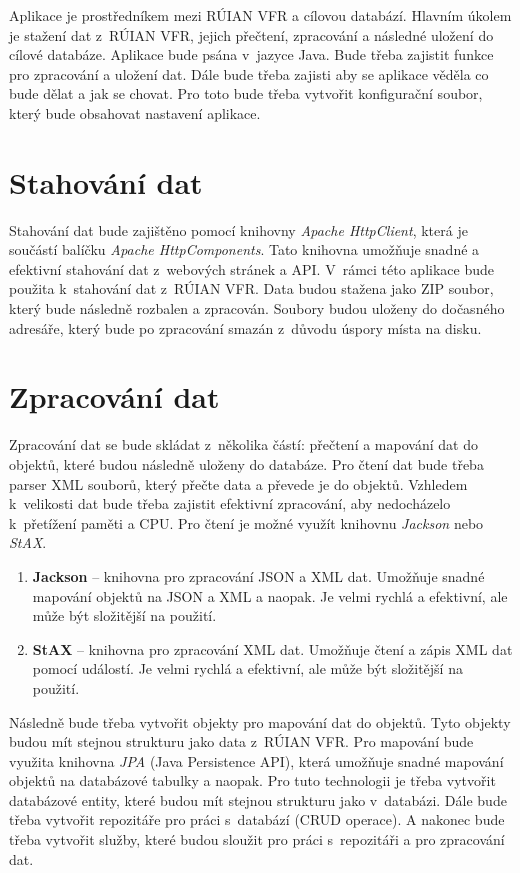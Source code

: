 Aplikace je prostředníkem mezi RÚIAN VFR a cílovou databází.
Hlavním úkolem je stažení dat z~RÚIAN VFR, jejich přečtení, zpracování a následné uložení do cílové databáze.
Aplikace bude psána v~jazyce Java. Bude třeba zajistit funkce pro zpracování a uložení dat.
Dále bude třeba zajisti aby se aplikace věděla co bude dělat a jak se chovat.
Pro toto bude třeba vytvořit konfigurační soubor, který bude obsahovat nastavení aplikace.

\section{Stahování dat}
Stahování dat bude zajištěno pomocí knihovny \textit{Apache HttpClient}, která je 
součástí balíčku \textit{Apache HttpComponents}. 
Tato knihovna umožňuje snadné a efektivní stahování dat z~webových stránek a API. 
V~rámci této aplikace bude použita k~stahování dat z~RÚIAN VFR.
Data budou stažena jako ZIP soubor, který bude následně rozbalen a zpracován.
Soubory budou uloženy do dočasného adresáře, který bude po zpracování smazán z~důvodu úspory místa na disku.

\section{Zpracování dat}
Zpracování dat se bude skládat z~několika částí:
přečtení a mapování dat do objektů, které budou následně uloženy do databáze.
Pro čtení dat bude třeba parser XML souborů, který přečte data a převede je do objektů.
Vzhledem k~velikosti dat bude třeba zajistit efektivní zpracování, aby nedocházelo 
k~přetížení paměti a CPU.
Pro čtení je možné využít knihovnu \textit{Jackson} nebo \textit{StAX}.

\begin{enumerate}
    \item \textbf{Jackson} -- knihovna pro zpracování JSON a XML dat. Umožňuje snadné mapování 
    objektů na JSON a XML a naopak. Je velmi rychlá a efektivní, ale může být složitější na použití.
    \item \textbf{StAX} -- knihovna pro zpracování XML dat. Umožňuje 
    čtení a zápis XML dat pomocí událostí. Je velmi rychlá a efektivní, ale může být 
    složitější na použití.
\end{enumerate}

Následně bude třeba vytvořit objekty pro mapování dat do objektů.
Tyto objekty budou mít stejnou strukturu jako data z~RÚIAN VFR.
Pro mapování bude využita knihovna \textit{JPA} (Java Persistence API), která umožňuje snadné 
mapování objektů na databázové tabulky a naopak.
Pro tuto technologii je třeba vytvořit databázové entity, které budou mít stejnou strukturu jako
v~databázi. Dále bude třeba vytvořit repozitáře pro práci s~databází (CRUD operace).
A nakonec bude třeba vytvořit služby, které budou sloužit pro práci s~repozitáři a pro zpracování dat.

